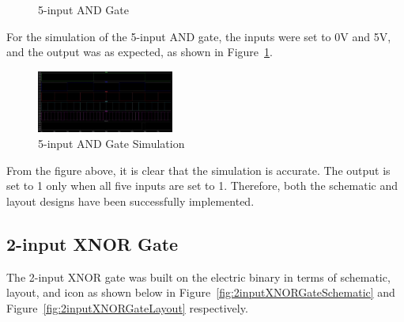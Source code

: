 \documentclass[conference]{IEEEtran}
\begin{document}
\begin{figure}[h]
    \centering
    \hfill
    \caption{5-input AND Gate}
\end{figure}

For the simulation of the 5-input AND gate, the inputs were set to 0V and 5V, and the output was as expected, as shown in Figure~\ref{fig:5inputANDGateSimulation}.
\begin{figure}[h]
    \centering
    \includegraphics[width=0.4\textwidth]{assets/5inputANDGateSimulation.jpg}
    \caption{5-input AND Gate Simulation}
    \label{fig:5inputANDGateSimulation}
\end{figure}

From the figure above, it is clear that the simulation is accurate. The output is set to 1 only when all five inputs are set to 1. Therefore, both the schematic and layout designs have been successfully implemented.

\subsection{2-input XNOR Gate}
The 2-input XNOR gate was built on the electric binary in terms of schematic, layout, and icon as shown below in Figure~\ref{fig:2inputXNORGateSchematic} and Figure~\ref{fig:2inputXNORGateLayout} respectively.
\end{document}
